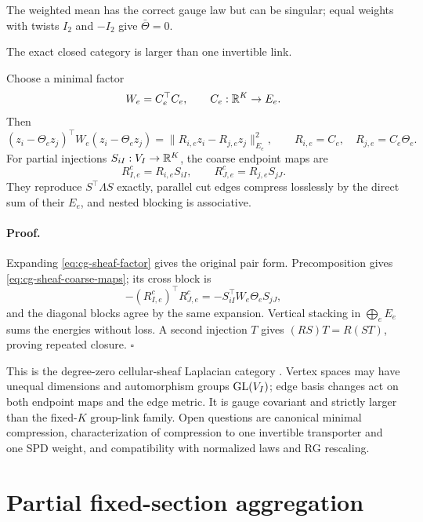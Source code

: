 The weighted mean has the correct gauge law but can be singular; equal weights
with twists \(I_2\) and \(-I_2\) give \(\bar\Theta=0\).

The exact closed category is larger than one invertible link.

Choose a minimal factor
\[
W_e=C_e^\top C_e,\qquad C_e:\mathbb R^K\to E_e .
\]
Then
\begin{equation}
(z_i-\Theta_ez_j)^\top W_e(z_i-\Theta_ez_j)
=\|R_{i,e}z_i-R_{j,e}z_j\|_{E_e}^2,
\qquad
R_{i,e}=C_e,\quad R_{j,e}=C_e\Theta_e.
\label{eq:cg-sheaf-factor}
\end{equation}
For partial injections \(S_{iI}:V_I\to\mathbb R^K\), the coarse endpoint maps are
\begin{equation}
R^c_{I,e}=R_{i,e}S_{iI},\qquad
R^c_{J,e}=R_{j,e}S_{jJ}.
\label{eq:cg-sheaf-coarse-maps}
\end{equation}
They reproduce \(S^\top\Lambda S\) exactly, parallel cut edges compress
losslessly by the direct sum of their \(E_e\), and nested blocking is
associative. 

\paragraph{Proof.}
Expanding \eqref{eq:cg-sheaf-factor} gives the original pair form.
Precomposition gives \eqref{eq:cg-sheaf-coarse-maps}; its cross block is
\[
-(R^c_{I,e})^\top R^c_{J,e}
=-S_{iI}^\top W_e\Theta_eS_{jJ},
\]
and the diagonal blocks agree by the same expansion. Vertical stacking in
\(\bigoplus_eE_e\) sums the energies without loss. A second injection \(T\)
gives \((RS)T=R(ST)\), proving repeated closure. \(\square\)

This is the degree-zero cellular-sheaf Laplacian category
\citep{HansenGhrist2019}. Vertex spaces may have unequal dimensions and
automorphism groups \(\mathrm{GL}(V_I)\); edge basis changes act on both endpoint
maps and the edge metric. It is gauge covariant and strictly larger than the
fixed-\(K\) group-link family. Open questions are canonical minimal
compression, characterization of compression to one invertible transporter
and one SPD weight, and compatibility with normalized laws and RG rescaling.

\section{Partial fixed-section aggregation}
\label{sec:cg-partial}

